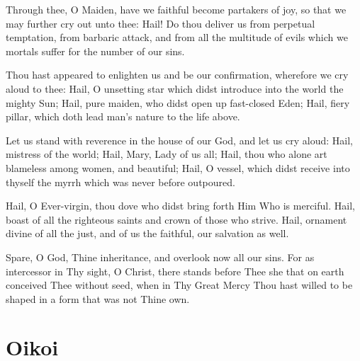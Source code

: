 \documentclass[twoside, letterpaper, 12pt]{report}
\begin{document}



Through thee, O Maiden, have we faithful become partakers of joy,
so that we may further cry out unto thee:
Hail! Do thou deliver us from perpetual temptation, from barbaric attack,
and from all the multitude of evils which we mortals suffer
for the number of our sins.


Thou hast appeared to enlighten us and be our confirmation,
wherefore we cry aloud to thee:
Hail, O unsetting star which didst introduce into the world the mighty Sun;
Hail, pure maiden, who didst open up fast-closed Eden;
Hail, fiery pillar, which doth lead man’s nature to the life above.


Let us stand with reverence in the house of our God, and let us cry aloud:
Hail, mistress of the world;
Hail, Mary, Lady of us all;
Hail, thou who alone art blameless among women, and beautiful;
Hail, O vessel, which didst receive into thyself the myrrh
which was never before outpoured.


Hail, O Ever-virgin, thou dove who didst bring forth Him Who is merciful.
Hail, boast of all the righteous saints and crown of those who strive.
Hail, ornament divine of all the just, and of us the faithful,
our salvation as well.


Spare, O God, Thine inheritance, and overlook now all our sins.
For as intercessor in Thy sight, O Christ,
there stands before Thee she that on earth conceived Thee without seed,
when in Thy Great Mercy
Thou hast willed to be shaped in a form that was not Thine own.


\chapter*{Oikoi}

\end{document}

